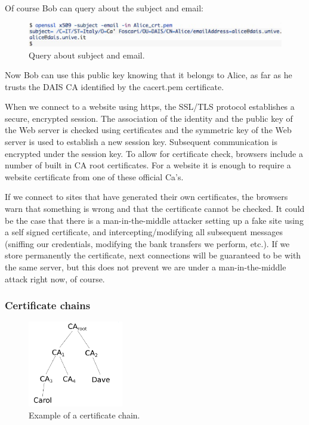 \documentclass[a4paper, 12pt]{report}
\begin{document}
Of course Bob can query about the subject and email:

\begin{figure}[H]
	\centering
	\includegraphics[scale=0.55	]{images/Lec23/cert7.png}
	\caption{Query about subject and email.}
	\label{fig:cert7}
\end{figure}

Now Bob can use this public key knowing that it belongs to Alice, as far as he trusts the DAIS CA identified by the cacert.pem certificate.

When we connect to a website using https, the SSL/TLS protocol establishes a secure, encrypted session. The association of the identity and the public key of the Web server is checked using certificates and the symmetric key of the Web server is used to establish a new session key. Subsequent communication is encrypted under the session key. To allow for certificate check, browsers include a number of built in CA root certificates. For a website it is enough to require a website certificate from one of these official Ca's.

If we connect to sites that have generated their own certificates, the browsers warn that something is wrong and that the certificate cannot be checked. It could be the case that there is a man-in-the-middle attacker setting up a fake site using a self signed certificate, and intercepting/modifying all subsequent messages (sniffing our credentials, modifying the bank transfers we perform, etc.). If we store permanently the certificate, next connections will be guaranteed to be with the same server, but this does not prevent we are under a man-in-the-middle attack right now, of course.

\newpage
\subsubsection{Certificate chains}

\begin{figure}
	\includegraphics[width=0.37\textwidth]{images/lec23/chain.png}
	\caption{Example of a certificate chain.}
	\label{fig:certChain}
\end{figure}
\end{document}
